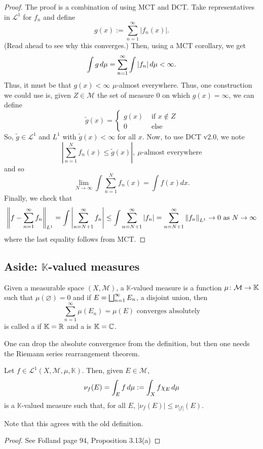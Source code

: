 \documentclass[11pt,leqno,oneside]{amsbook}
\numberwithin{thm}{section}
\newcommand{\M}{\mathcal{M}} %
\newcommand{\cL}{\mathcal{L}}
\newcommand{\K}{\mathbb{K}} %
\renewcommand{\emptyset}{\varnothing}
\begin{document}
\begin{proof}
  The proof is a combination of using MCT and DCT. Take representatives
  in \(\cL^1\) for \(f_n\) and define \[
    g(x) := \sum_{n=1}^\infty |f_n(x)|.
  \]
  (Read ahead to see why this converges.) Then, using a MCT corollary, we
  get \[
    \int g \d\mu = \sum_{n=1}^\infty \int |f_n| \d\mu < \infty.
  \]
  Thus, it must be that \(g(x) < \infty\) \(\mu\)-almost everywhere.
  Thus, one construction we could use is, given \(Z \in \M\) the set
  of measure 0 on which \(g(x) = \infty\), we can define \[
    \tilde{g}(x) =
    \begin{cases}
      g(x) & \text{ if } x \not\in Z \\
      0 & \text{ else }
    \end{cases}
  \]
  So, \(\tilde{g} \in \cL^1\) and \(L^1\) with \(\tilde{g}(x) <
  \infty\) for all \(x\). Now, to use DCT v2.0, we note \[
    \left| \sum_{n=1}^N f_n(x) \leq \tilde{g}(x) \right|, \
    \mu\text{-almost everywhere}
  \]
  and so \[
    \lim_{N \to \infty} \int \sum_{n=1}^N f_n(x) = \int f(x) dx.
  \]
  Finally, we check that \[
    \norm[f - \sum_{n=1}^\infty f_n]_{L^1} = \int \left|
      \sum_{n=N+1}^\infty f_n \right| \leq \int \sum_{n=N+1}^\infty
    |f_n| = \sum_{n=N+1}^\infty \norm[f_n]_{L^1} \to 0 \text{ as } N
    \to \infty
  \]
  where the last equality follows from MCT.
\end{proof}
\subsection{Aside: \(\K\)-valued measures}
\begin{defn}
  Given a measurable space \((X,\M)\), a \(\K\)-valued measure is a
  function \(\mu \from \M \to \K\) such that \(\mu(\emptyset) = 0\)
  and if \(E = \Dunion_{n=1}^\infty E_n\), a disjoint union, then \[
    \sum_{n=1}^\infty \mu(E_n) = \mu(E) \text{ converges absolutely}
  \]
  is called a  if \(\K=\R\) and a \de{complex
    measure} is \(\K=\C\).
\end{defn}
\begin{rmk}
  One can drop the absolute convergence from the definition, but then
  one needs the Riemann series rearrangement theorem.
\end{rmk}
\begin{prop}
  Let \(f \in \cL^1(X,\M,\mu,\K)\). Then, given \(E \in \M\), \[
    \nu_f(E) = \int_E f \d\mu := \int_X f \chi_E \d\mu
  \]
  is a \(\K\)-valued measure such that, for all \(E\), \(|\nu_f(E)|
  \leq \nu_{|f|}(E)\).
\end{prop}
Note that this agrees with the old definition.
\begin{proof}
  See Folland page 94, Proposition 3.13(a)
\end{proof}
\end{document}
